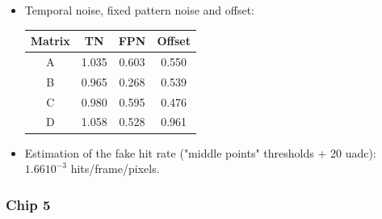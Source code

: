 \documentclass[a4papper, 10pt]{article}
\begin{document}
\begin{itemize}
    \item Temporal noise, fixed pattern noise and offset:

            \begin{center}
              \begin{tabular}{ c c c c }
                \hline %
         \rowcolor{light-gray}         Matrix  &  TN   &  FPN  &  Offset  \tabularnewline
                \hline %
                \hline %
                    A     & 1.035 & 0.603 & 0.550    \tabularnewline
                \hline %
                    B     & 0.965 & 0.268 & 0.539   \tabularnewline
                \hline %
                    C     & 0.980 & 0.595 & 0.476   \tabularnewline
                \hline %
                    D     & 1.058 & 0.528 & 0.961    \tabularnewline
                \hline %
              \end{tabular}
            \end{center}

    \item Estimation of the fake hit rate ("middle points" thresholds + 20 uadc): $1.66 10^{-3}$ hits/frame/pixels. 
  
    \end{itemize}

    \subsubsection{Chip 5}
  
\end{document}
